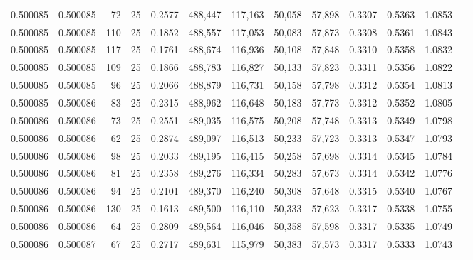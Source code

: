 \begin{tabular}{rrrrrrrrrrrrr}
0.500085 & 0.500085 &    72 &  25 &                                     0.2577 & 488,447 & 117,163 &  50,058 &  57,898 & 0.3307 & 0.5363 & 1.0853 \\
0.500085 & 0.500085 &   110 &  25 &                                     0.1852 & 488,557 & 117,053 &  50,083 &  57,873 & 0.3308 & 0.5361 & 1.0843 \\
0.500085 & 0.500085 &   117 &  25 &                                     0.1761 & 488,674 & 116,936 &  50,108 &  57,848 & 0.3310 & 0.5358 & 1.0832 \\
0.500085 & 0.500085 &   109 &  25 &                                     0.1866 & 488,783 & 116,827 &  50,133 &  57,823 & 0.3311 & 0.5356 & 1.0822 \\
0.500085 & 0.500085 &    96 &  25 &                                     0.2066 & 488,879 & 116,731 &  50,158 &  57,798 & 0.3312 & 0.5354 & 1.0813 \\
0.500085 & 0.500086 &    83 &  25 &                                     0.2315 & 488,962 & 116,648 &  50,183 &  57,773 & 0.3312 & 0.5352 & 1.0805 \\
0.500086 & 0.500086 &    73 &  25 &                                     0.2551 & 489,035 & 116,575 &  50,208 &  57,748 & 0.3313 & 0.5349 & 1.0798 \\
0.500086 & 0.500086 &    62 &  25 &                                     0.2874 & 489,097 & 116,513 &  50,233 &  57,723 & 0.3313 & 0.5347 & 1.0793 \\
0.500086 & 0.500086 &    98 &  25 &                                     0.2033 & 489,195 & 116,415 &  50,258 &  57,698 & 0.3314 & 0.5345 & 1.0784 \\
0.500086 & 0.500086 &    81 &  25 &                                     0.2358 & 489,276 & 116,334 &  50,283 &  57,673 & 0.3314 & 0.5342 & 1.0776 \\
0.500086 & 0.500086 &    94 &  25 &                                     0.2101 & 489,370 & 116,240 &  50,308 &  57,648 & 0.3315 & 0.5340 & 1.0767 \\
0.500086 & 0.500086 &   130 &  25 &                                     0.1613 & 489,500 & 116,110 &  50,333 &  57,623 & 0.3317 & 0.5338 & 1.0755 \\
0.500086 & 0.500086 &    64 &  25 &                                     0.2809 & 489,564 & 116,046 &  50,358 &  57,598 & 0.3317 & 0.5335 & 1.0749 \\
0.500086 & 0.500087 &    67 &  25 &                                     0.2717 & 489,631 & 115,979 &  50,383 &  57,573 & 0.3317 & 0.5333 & 1.0743 \\

\end{tabular}
